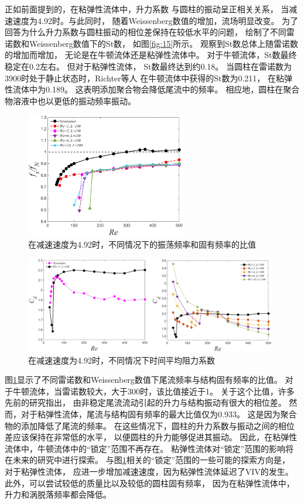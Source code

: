 \documentclass[UTF8,zihao=5]{ctexart} %
\begin{document}
正如前面提到的，在粘弹性流体中，升力系数
与圆柱的振动呈正相关关系，
当减速速度为4.92时。与此同时，
随着Weissenberg数值的增加，流场明显改变。
为了回答为什么升力系数与圆柱振动的相位差保持在较低水平的问题，
绘制了不同雷诺数和Weissenberg数值下的St数，
如图\ref{fig:15}所示。
观察到St数总体上随雷诺数的增加而增加，
无论是在牛顿流体还是粘弹性流体中。
对于牛顿流体，St数最终稳定在0.2左右。
但对于粘弹性流体，
St数最终达到约0.18。
当圆柱在雷诺数为3900时处于静止状态时，Richter等人
在牛顿流体中获得的St数为0.211，
在粘弹性流体中为0.189。
这表明添加聚合物会降低尾流中的频率。
相应地，圆柱在聚合物溶液中也以更低的振动频率振动。

\begin{figure}[htbp]
    \centering
    \includegraphics[width=7cm]{fig16.jpg}
    \caption{
        在减速速度为4.92时，不同情况下的振荡频率和固有频率的比值
    }
    \label{fig:16}
\end{figure}

\begin{figure}[htbp]
    \centering
    \includegraphics[width=11cm]{fig17.jpg}
    \caption{
        在减速速度为4.92时，不同情况下时间平均阻力系数
    }
    \label{fig:17}
\end{figure}

图\ref{fig:16}显示了不同雷诺数和Weissenberg数值下尾流频率与结构固有频率的比值。
对于牛顿流体，当雷诺数较大，大于300时，该比值接近于1。
关于这个比值，许多先前的研究指出，
由非稳定尾流流动引起的升力与结构振动有很大的相位差。
然而，对于粘弹性流体，尾流与结构固有频率的最大比值仅为0.933。
这是因为聚合物的添加降低了尾流的频率。
在这些情况下，圆柱的升力系数与振动之间的相位差应该保持在非常低的水平，
以便圆柱的升力能够促进其振动。
因此，在粘弹性流体中，牛顿流体中的“锁定”范围不再存在。
粘弹性流体对“锁定”范围的影响将在未来的研究中进行探索。
与图\ref{fig:16}相关的“锁定”范围的一些可能的探索方向是，
对于粘弹性流体，
应进一步增加减速速度，因为粘弹性流体延迟了VIV的发生。
此外，可以尝试较低的质量比以及较低的圆柱固有频率，
因为在粘弹性流体中，升力和涡脱落频率都会降低。
\end{document}
